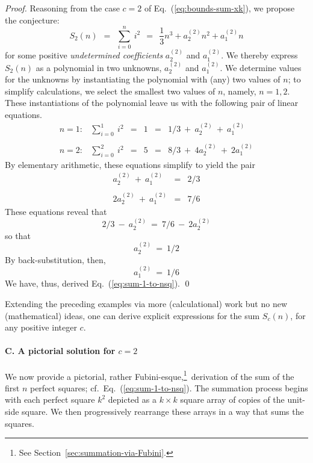 \begin{proof}
Reasoning from the case $c=2$ of Eq.~(\ref{eq:bounds-sum-xk}), we propose the conjecture:
\begin{equation}
\label{eq:symbolic-cubic}
S_2(n) \ \ = \ \
\sum_{i=0}^n \ i^2 \ \ = \ \ \frac{1}{3} n^3 + a^{(2)}_2 n^2 + a^{(2)}_1 n
\end{equation}
for some positive {\it undetermined coefficients} $a^{(2)}_2$ and $a^{(2)}_1$.  We thereby express $S_2(n)$ as a polynomial in two unknowns, $a^{(2)}_2$ and $a^{(2)}_1$.  We determine values for the unknowns by instantiating the polynomial with (any) two values of $n$; to simplify calculations, we select the smallest two values of $n$, namely, $n = 1,2$.  These instantiations of the polynomial leave us with the following pair of linear equations.
\[
\begin{array}{cccccl}
n=1: & \sum_{i=0}^1 \ i^2
   & = & 1 & = &
1/3 \ + \ a^{(2)}_2 \ + \ a^{(2)}_1 \\
 & & & & & \\
n=2: & \sum_{i=0}^2 \ i^2
   & = & 5 & = &
8/3 \ + \ 4 a^{(2)}_2 \ + \ 2 a^{(2)}_1
\end{array}
\]
By elementary arithmetic, these equations simplify to yield the pair
\[
\begin{array}{ccc}
a^{(2)}_2 \ + \ a^{(2)}_1   & = & 2/3 \\
 & & \\
2 a^{(2)}_2 \ + \ a^{(2)}_1 & = & 7/6
\end{array}
\]
These equations reveal that
\[ 2/3 \ - \ a^{(2)}_2 \ = \ 7/6 \ - \ 2 a^{(2)}_2 \]
so that 
\[ a^{(2)}_2 \ = \ 1/2 \]
By back-substitution, then,
\[ a^{(2)}_1 \ = \ 1/6 \]
We have, thus, derived Eq.~(\ref{eq:sum-1-to-nsq}).  \qed
\end{proof}

\medskip

Extending the preceding examples via more (calculational) work but no new (mathematical) ideas, one can derive explicit expressions for the sum $S_c(n)$, for any positive integer $c$.

\medskip 

\paragraph{C. A pictorial solution for $c=2$}

We now provide a pictorial, rather 
Fubini-esque,\footnote{See Section~\ref{sec:summation-via-Fubini}.}~derivation of the sum of the first $n$ perfect squares; cf.~Eq.~(\ref{eq:sum-1-to-nsq}).  The summation process begins with each perfect square $k^2$ depicted as a $k \times k$ square array of copies of the unit-side square.  We then progressively rearrange these arrays in a way that sums the squares. 


